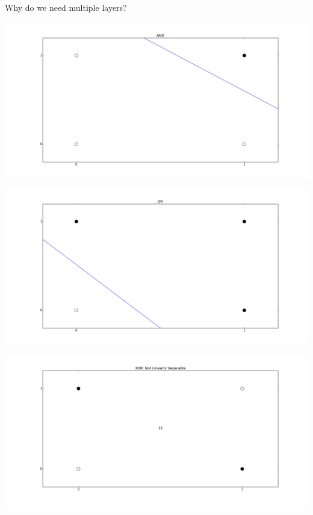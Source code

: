 \begin{frame}
  \begin{center}
    {\Large Why do we need multiple layers?}
  \end{center}
\end{frame}

\begin{frame}
  \begin{center}
    \includegraphics[scale=0.25]{pictures/and.png}
  \end{center}
\end{frame}

\begin{frame}
  \begin{center}
    \includegraphics[scale=0.25]{pictures/or.png}
  \end{center}
\end{frame}

\begin{frame}
  \begin{center}
    \includegraphics[scale=0.25]{pictures/xor.png}
  \end{center}
\end{frame}


